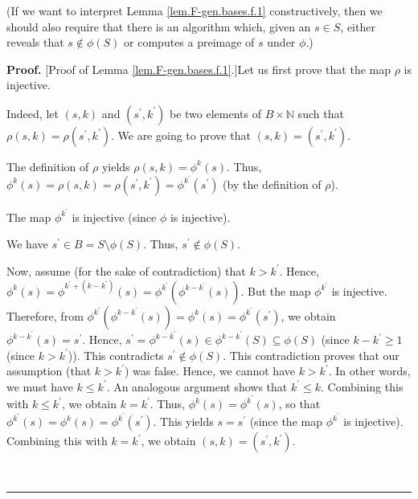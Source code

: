 \documentclass[numbers=enddot,12pt,final,onecolumn,notitlepage]{scrartcl}%
\theoremstyle{definition}
\newenvironment{proof}[1][Proof]{\noindent\textbf{#1.} }{\ \rule{0.5em}{0.5em}}
\begin{document}
(If we want to interpret Lemma \ref{lem.F-gen.bases.f.1} constructively, then
we should also require that there is an algorithm which, given an $s\in S$,
either reveals that $s\notin\phi\left(  S\right)  $ or computes a preimage of
$s$ under $\phi$.)

\begin{proof}
[Proof of Lemma \ref{lem.F-gen.bases.f.1}.]Let us first prove that the map
$\rho$ is injective.

Indeed, let $\left(  s,k\right)  $ and $\left(  s^{\prime},k^{\prime}\right)
$ be two elements of $B\times\mathbb{N}$ such that $\rho\left(  s,k\right)
=\rho\left(  s^{\prime},k^{\prime}\right)  $. We are going to prove that
$\left(  s,k\right)  =\left(  s^{\prime},k^{\prime}\right)  $.

The definition of $\rho$ yields $\rho\left(  s,k\right)  =\phi^{k}\left(
s\right)  $. Thus, $\phi^{k}\left(  s\right)  =\rho\left(  s,k\right)
=\rho\left(  s^{\prime},k^{\prime}\right)  =\phi^{k^{\prime}}\left(
s^{\prime}\right)  $ (by the definition of $\rho$).

The map $\phi^{k^{\prime}}$ is injective (since $\phi$ is injective).

We have $s^{\prime}\in B=S\setminus\phi\left(  S\right)  $. Thus, $s^{\prime
}\notin\phi\left(  S\right)  $.

Now, assume (for the sake of contradiction) that $k>k^{\prime}$. Hence,
$\phi^{k}\left(  s\right)  =\phi^{k^{\prime}+\left(  k-k^{\prime}\right)
}\left(  s\right)  =\phi^{k^{\prime}}\left(  \phi^{k-k^{\prime}}\left(
s\right)  \right)  $. But the map $\phi^{k^{\prime}}$ is injective. Therefore,
from $\phi^{k^{\prime}}\left(  \phi^{k-k^{\prime}}\left(  s\right)  \right)
=\phi^{k}\left(  s\right)  =\phi^{k^{\prime}}\left(  s^{\prime}\right)  $, we
obtain $\phi^{k-k^{\prime}}\left(  s\right)  =s^{\prime}$. Hence, $s^{\prime
}=\phi^{k-k^{\prime}}\left(  s\right)  \in\phi^{k-k^{\prime}}\left(  S\right)
\subseteq\phi\left(  S\right)  $ (since $k-k^{\prime}\geq1$ (since
$k>k^{\prime}$)). This contradicts $s^{\prime}\notin\phi\left(  S\right)  $.
This contradiction proves that our assumption (that $k>k^{\prime}$) was false.
Hence, we cannot have $k>k^{\prime}$. In other words, we must have $k\leq
k^{\prime}$. An analogous argument shows that $k^{\prime}\leq k$. Combining
this with $k\leq k^{\prime}$, we obtain $k=k^{\prime}$. Thus, $\phi^{k}\left(
s\right)  =\phi^{k^{\prime}}\left(  s\right)  $, so that $\phi^{k^{\prime}%
}\left(  s\right)  =\phi^{k}\left(  s\right)  =\phi^{k^{\prime}}\left(
s^{\prime}\right)  $. This yields $s=s^{\prime}$ (since the map $\phi
^{k^{\prime}}$ is injective). Combining this with $k=k^{\prime}$, we obtain
$\left(  s,k\right)  =\left(  s^{\prime},k^{\prime}\right)  $.


\end{proof}
\end{document}
